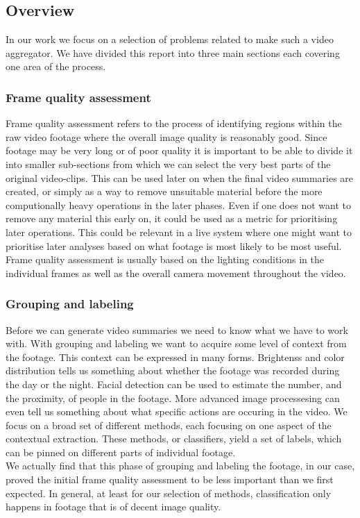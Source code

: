\subsection{Overview}
%
In our work we focus on a selection of problems related to make such a video aggregator. We have divided this report into three main sections each covering one area of the process.
%
\subsubsection{Frame quality assessment} \label{sec:videoclipsegmentation}
%
Frame quality assessment refers to the process of identifying regions within the raw video footage where the overall image quality is reasonably good. Since footage may be very long or of poor quality it is important to be able to divide it into smaller sub-sections from which we can select the very best parts of the original video-clips. This can be used later on when the final video summaries are created, or simply as a way to remove unsuitable material before the more computionally heavy operations in the later phases. Even if one does not want to remove any material this early on, it could be used as a metric for prioritising later operations. This could be relevant in a live system where one might want to prioritise later analyses based on what footage is most likely to be most useful. Frame quality assessment is usually based on the lighting conditions in the individual frames as well as the overall camera movement throughout the video.
\subsubsection{Grouping and labeling}
%
Before we can generate video summaries we need to know what we have to work with. With grouping and labeling we want to acquire some level of context from the footage. This context can be expressed in many forms. Brightenss and color distribution tells us something about whether the footage was recorded during the day or the night. Facial detection can be used to estimate the number, and the proximity, of people in the footage. More advanced image processesing can even tell us something about what specific actions are occuring in the video. We focus on a broad set of different methods, each focusing on one aspect of the contextual extraction. These methods, or classifiers, yield a set of labels, which can be pinned on different parts of individual footage.\\
We actually find that this phase of grouping and labeling the footage, in our case, proved the initial frame quality assessment to be less important than we first expected. In general, at least for our selection of methods, classification only happens in footage that is of decent image quality.
%
